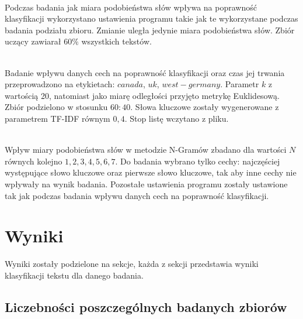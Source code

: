\documentclass{classrep}
\begin{document}
\\Podczas badania jak miara podobieństwa słów wpływa na poprawność klasyfikacji wykorzystano ustawienia
programu takie jak te wykorzystane podczas badania podziału zbioru. Zmianie uległa jedynie miara podobieństwa słów.
Zbiór uczący zawiarał $60\%$ wszystkich tekstów.

\\Badanie wpływu danych cech na poprawność klasyfikacji oraz czas jej trwania przeprowadzono na
etykietach: $canada$, $uk$, $west-germany$. Parametr $k$ z wartością 20, natomiast jako miarę odległości
przyjęto metrykę Euklidesową. Zbiór podzielono w stosunku $60:40$. Słowa kluczowe zostały wygenerowane
z parametrem TF-IDF równym $0,4$. Stop listę wczytano z pliku.

\\Wpływ miary podobieństwa słów w metodzie N-Gramów zbadano dla wartości $N$ równych kolejno ${1,2,3,4,5,6,7}$.
Do badania wybrano tylko cechy: najczęściej występujące słowo kluczowe oraz pierwsze słowo kluczowe, tak
aby inne cechy nie wpływały na wynik badania. Pozostałe ustawienia programu zostały ustawione tak jak podczas badania wpływu danych cech na
poprawność klasyfikacji.





\section{Wyniki}
Wyniki zostały podzielone na sekcje, każda z sekcji przedstawia wyniki klasyfikacji tekstu
dla danego badania.
\subsection{Liczebności poszczególnych badanych zbiorów}
\end{document}
